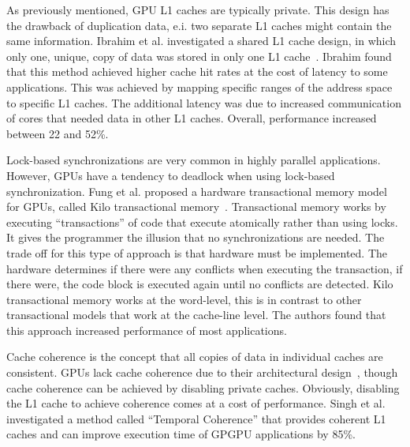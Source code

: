 As previously mentioned, GPU L1 caches are typically private.
This design has the drawback of duplication data, e.i. two separate L1 caches might contain the same information.
Ibrahim et al. investigated a shared L1 cache design, in which only one, unique, copy of data was stored in only one L1 cache~\cite{Ibrahim2020}.
Ibrahim found that this method achieved higher cache hit rates at the cost of latency to some applications.
This was achieved by mapping specific ranges of the address space to specific L1 caches.
The additional latency was due to increased communication of cores that needed data in other L1 caches.
Overall, performance increased between 22 and 52\%.

Lock-based synchronizations are very common in highly parallel applications.
However, GPUs have a tendency to deadlock when using lock-based synchronization.
Fung et al. proposed a hardware transactional memory model for GPUs, called Kilo transactional memory~\cite{Fung2011ISM}.
Transactional memory works by executing ``transactions'' of code that execute atomically rather than using locks.
It gives the programmer the illusion that no synchronizations are needed.
The trade off for this type of approach is that hardware must be implemented.
The hardware determines if there were any conflicts when executing the transaction, if there were, the code block is executed again until no conflicts are detected.
Kilo transactional memory works at the word-level, this is in contrast to other transactional models that work at the cache-line level.
The authors found that this approach increased performance of most applications.

Cache coherence is the concept that all copies of data in individual caches are consistent.
GPUs lack cache coherence due to their architectural design~\cite{Singh2013}, though cache coherence can be achieved by disabling private caches.
Obviously, disabling the L1 cache to achieve coherence comes at a cost of performance. Singh et al. investigated a method called ``Temporal Coherence'' that provides coherent L1 caches and can improve execution time of GPGPU applications by 85\%.


